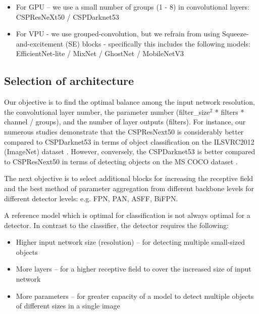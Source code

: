 \documentclass[10pt,twocolumn,letterpaper]{article}
\begin{document}
\begin{itemize}
	\item For GPU – we use a small number of groups (1 - 8) in convolutional layers: CSPResNeXt50 / CSPDarknet53
	\item For VPU - we use grouped-convolution, but we refrain from using Squeeze-and-excitement (SE) blocks - specifically this includes the following models: EfficientNet-lite / MixNet \cite{tan2019mixnet} / GhostNet \cite{han2019ghostnet} / MobileNetV3
\end{itemize}


\subsection{Selection of architecture}

Our objective is to find the optimal balance among the input network resolution, the convolutional layer number, the parameter number (filter\_size$^2$ * filters * channel / groups), and the number of layer outputs (filters). For instance, our numerous studies demonstrate that the CSPResNext50 is considerably better compared to CSPDarknet53 in terms of object classification on the ILSVRC2012 (ImageNet) dataset \cite{deng2009imagenet}. However, conversely, the CSPDarknet53 is better compared to CSPResNext50 in terms of detecting objects on the MS COCO dataset \cite{lin2014microsoft}.

The next objective is to select additional blocks for increasing the receptive field and the best method of parameter aggregation from different backbone levels for different detector levels: e.g. FPN, PAN, ASFF, BiFPN.

A reference model which is optimal for classification is not always optimal for a detector. In contrast to the classifier, the detector requires the following:

\begin{itemize}
	\item Higher input network size (resolution) -- for detecting multiple small-sized objects
	\item More layers -- for a higher receptive field to cover the increased size of input network
	\item More parameters -- for greater capacity of a model to detect multiple objects of different sizes in a single image
\end{itemize}
\end{document}
